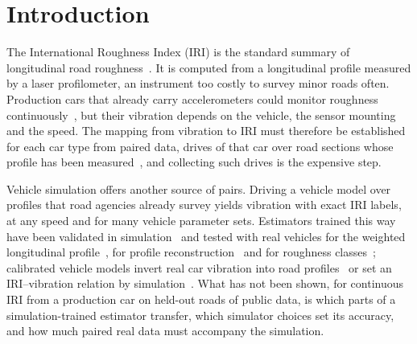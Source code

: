 \section{Introduction}
\label{sec:intro}
The International Roughness Index (IRI) is the standard summary of longitudinal road roughness~\cite{sayers1986tp45,astm_e1926}.
It is computed from a longitudinal profile measured by a laser profilometer, an instrument too costly to survey minor roads often.
Production cars that already carry accelerometers could monitor roughness continuously~\cite{sattar2018review,sang2024iri,levenberg2021lira}, but their vibration depends on the vehicle, the sensor mounting and the speed.
The mapping from vibration to IRI must therefore be established for each car type from paired data, drives of that car over road sections whose profile has been measured~\cite{sayers1986tp46}, and collecting such drives is the expensive step.

Vehicle simulation offers another source of pairs.
Driving a vehicle model over profiles that road agencies already survey yields vibration with exact IRI labels, at any speed and for many vehicle parameter sets.
Estimators trained this way have been validated in simulation~\cite{jeong2020cnn,rcnn2023sim} and tested with real vehicles for the weighted longitudinal profile~\cite{nitsche2014wlp}, for profile reconstruction~\cite{ngwangwa2014exp} and for roughness classes~\cite{speedadaptive2025}; calibrated vehicle models invert real car vibration into road profiles~\cite{skar2024inversion,agebjar2025fusion} or set an IRI--vibration relation by simulation~\cite{wu2023calib}.
What has not been shown, for continuous IRI from a production car on held-out roads of public data, is which parts of a simulation-trained estimator transfer, which simulator choices set its accuracy, and how much paired real data must accompany the simulation.

